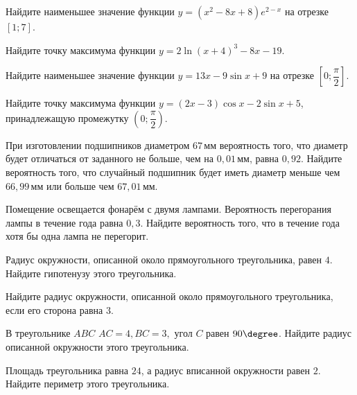 \begin{homework}[number=4]
	\begin{listofex}
		\item Найдите наименьшее значение функции \( y=(x^2-8x+8)e^{2-x} \) на отрезке \( [1;7] \).
		\item Найдите точку максимума функции \( y=2\ln(x+4)^3-8x-19 \).
		\item Найдите наименьшее значение функции \( y=13x-9\sin x+9 \) на отрезке \( \left[ 0;\dfrac{ \pi }{ 2 } \right] \).
		\item Найдите точку максимума функции \( y=(2x-3)\cos x - 2 \sin x+5 \), принадлежащую промежутку \( \left( 0; \dfrac{ \pi }{ 2 } \right) \).
		\item При изготовлении подшипников диаметром \(67\) мм вероятность того, что диаметр будет отличаться от заданного не больше, чем на \(0,01\) мм, равна \(0,92\). Найдите вероятность того, что случайный подшипник будет иметь диаметр меньше чем \(66,99\) мм или больше чем \(67,01\) мм.
		\item Помещение освещается фонарём с двумя лампами. Вероятность перегорания лампы в течение года равна \(0,3\). Найдите вероятность того, что в течение года хотя бы одна лампа не перегорит.
		\item Радиус окружности, описанной около прямоугольного треугольника, равен \(4\). Найдите гипотенузу этого треугольника.
		\item Найдите радиус окружности, описанной около прямоугольного треугольника, если его сторона равна \(3\).
		\item В треугольнике \(ABC\) \(AC = 4, BC = 3,\) угол \(C\) равен \(90\degree \). Найдите радиус описанной окружности этого треугольника.
		\item Площадь треугольника равна \(24\), а радиус вписанной окружности равен \(2\). Найдите периметр этого треугольника.

\end{listofex}
\end{homework}
